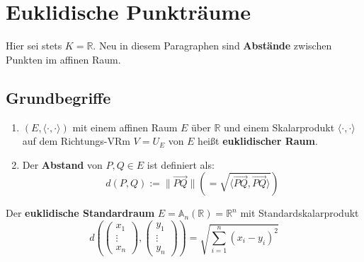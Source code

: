 \documentclass[parskip,a4paper,twoside,DIV15,BCOR12mm]{scrbook}
\begin{document}
\chapter{Euklidische Punkträume}

Hier sei stets $K=\mathbb{R}$. Neu in diesem Paragraphen sind \textbf{Abstände}
zwischen Punkten im affinen Raum.

\section{Grundbegriffe}

\begin{definition}
\begin{enumerate}
\item $(E,\langle\cdot,\cdot\rangle)$ mit einem affinen Raum $E$ über $\mathbb{R}$
und einem Skalarprodukt $\langle\cdot,\cdot\rangle$ auf dem Richtungs-VRm $V=U_E$ 
von $E$ heißt \textbf{euklidischer Raum}.
\item Der \textbf{Abstand} von $P,Q\in E$ ist definiert als:
\[d(P,Q):=\|\overrightarrow{PQ}\| \left(=\sqrt{\langle\overrightarrow{PQ},\overrightarrow{PQ}\rangle}\right)\]
\end{enumerate}
\end{definition}

\begin{example}
Der \textbf{euklidische Standardraum} $E=\mathbb{A}_n(\mathbb{R})=\mathbb{R}^n$ mit Standardskalarprodukt
\[d(\begin{pmatrix}x_1\\\vdots\\x_n\end{pmatrix},\begin{pmatrix}y_1\\\vdots\\y_n\end{pmatrix})
=\sqrt{\sum_{i=1}^n(x_i-y_i)^2}\]
\end{example}

\begin{comment}
Der Abstand $d$ eines euklidischen Raums $E$ definiert eine Metrik auf $E$ (Positivdefinitheit, Symmetrie
und Dreiecksungleichung).
\end{comment}
\end{document}
